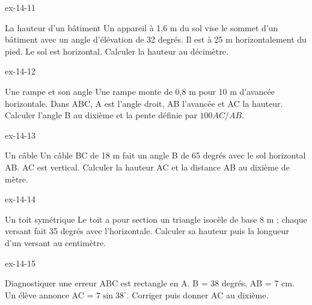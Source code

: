 \clearpage{}
\begin{blocLivre}{ex-14-11}\begin{exercice}[3]{La hauteur d’un bâtiment}
Un appareil à 1,6 m du sol vise le sommet d’un bâtiment avec un angle d’élévation de 32 degrés. Il est à 25 m horizontalement du pied. Le sol est horizontal. Calculer la hauteur au décimètre.
\label{fig-ex-14-11}
\end{exercice}\end{blocLivre}
\begin{blocLivre}{ex-14-12}\begin{exercice}[3]{Une rampe et son angle}
Une rampe monte de 0,8 m pour 10 m d’avancée horizontale. Dans ABC, A est l’angle droit, AB l’avancée et AC la hauteur. Calculer l’angle B au dixième et la pente définie par $100AC/AB$.
\label{fig-ex-14-12}
\end{exercice}\end{blocLivre}
\begin{blocLivre}{ex-14-13}\begin{exercice}[3]{Un câble}
Un câble BC de 18 m fait un angle B de 65 degrés avec le sol horizontal AB. AC est vertical. Calculer la hauteur AC et la distance AB au dixième de mètre.
\label{fig-ex-14-13}
\end{exercice}\end{blocLivre}
\begin{blocLivre}{ex-14-14}\begin{exercice}[3]{Un toit symétrique}
Le toit a pour section un triangle isocèle de base 8 m ; chaque versant fait 35 degrés avec l’horizontale. Calculer sa hauteur puis la longueur d’un versant au centimètre.
\label{fig-ex-14-14}
\end{exercice}\end{blocLivre}
\begin{blocLivre}{ex-14-15}\begin{exercice}[3]{Diagnostiquer une erreur}
ABC est rectangle en A. B = 38 degrés, AB = 7 cm. Un élève annonce AC = $7\sin38^\circ$. Corriger puis donner AC au dixième.
\label{fig-ex-14-15}
\end{exercice}\end{blocLivre}

\clearpage
